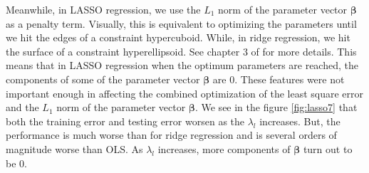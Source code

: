 Meanwhile, in LASSO regression, we use the $L_1$ norm of the parameter vector $\boldsymbol \beta$ as a penalty term. Visually, this is equivalent to optimizing the parameters until we hit the edges of a constraint hypercuboid. While, in ridge regression, we hit the surface of a constraint hyperellipsoid. See chapter 3 of \cite{friedman2001elements} for more details. This means that in LASSO regression when the optimum parameters are reached, the components of some of the parameter vector $\boldsymbol \beta$ are 0. These features were not important enough in affecting the combined optimization of the least square error and the $L_1$ norm of the parameter vector $\boldsymbol \beta$. We see in the figure \ref{fig:lasso7} that both the training error and testing error worsen as the $\lambda_l$ increases. But, the performance is much worse than for ridge regression and is several orders of magnitude worse than OLS. As $\lambda_l$ increases, more components of $\boldsymbol \beta$ turn out to be 0. 



